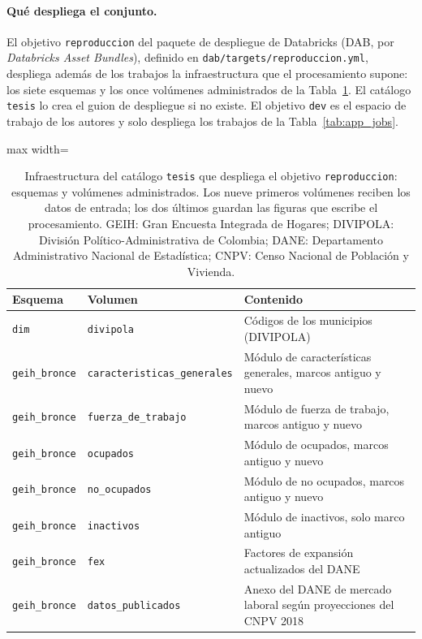 \paragraph{Qué despliega el conjunto.} El objetivo \texttt{reproduccion} del paquete de despliegue de Databricks (DAB, por \textit{Databricks Asset Bundles}), definido en \texttt{dab/targets/reproduccion.yml}, despliega además de los trabajos la infraestructura que el procesamiento supone: los siete esquemas y los once volúmenes administrados de la Tabla~\ref{tab:app_infra}. El catálogo \texttt{tesis} lo crea el guion de despliegue si no existe. El objetivo \texttt{dev} es el espacio de trabajo de los autores y solo despliega los trabajos de la Tabla~\ref{tab:app_jobs}.

\begin{table}[!htbp]
\centering
\small
\caption[Infraestructura del objetivo \texttt{reproduccion}]{Infraestructura del catálogo \texttt{tesis} que despliega el objetivo \texttt{reproduccion}: esquemas y volúmenes administrados. Los nueve primeros volúmenes reciben los datos de entrada; los dos últimos guardan las figuras que escribe el procesamiento. GEIH: Gran Encuesta Integrada de Hogares; DIVIPOLA: División Político-Administrativa de Colombia; DANE: Departamento Administrativo Nacional de Estadística; CNPV: Censo Nacional de Población y Vivienda.}
\label{tab:app_infra}
\begin{adjustbox}{max width=\linewidth}
\begin{tabular}{l l p{7.2cm}}
\toprule
Esquema & Volumen & Contenido \\
\midrule
\texttt{dim} & \texttt{divipola} & Códigos de los municipios (DIVIPOLA) \\
\texttt{geih\_bronce} & \texttt{caracteristicas\_generales} & Módulo de características generales, marcos antiguo y nuevo \\
\texttt{geih\_bronce} & \texttt{fuerza\_de\_trabajo} & Módulo de fuerza de trabajo, marcos antiguo y nuevo \\
\texttt{geih\_bronce} & \texttt{ocupados} & Módulo de ocupados, marcos antiguo y nuevo \\
\texttt{geih\_bronce} & \texttt{no\_ocupados} & Módulo de no ocupados, marcos antiguo y nuevo \\
\texttt{geih\_bronce} & \texttt{inactivos} & Módulo de inactivos, solo marco antiguo \\
\texttt{geih\_bronce} & \texttt{fex} & Factores de expansión actualizados del DANE \\
\texttt{geih\_bronce} & \texttt{datos\_publicados} & Anexo del DANE de mercado laboral según proyecciones del CNPV 2018 \\

\end{tabular}
\end{adjustbox}
\end{table}
